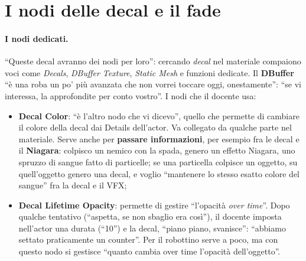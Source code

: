 \section{I nodi delle decal e il fade}
\label{ue16:sec:nodidecal}

\paragraph{I nodi dedicati.} ``Queste decal avranno dei nodi per loro'': cercando \emph{decal}
nel materiale compaiono voci come \emph{Decals}, \emph{DBuffer Texture}, \emph{Static Mesh} e
funzioni dedicate. Il \textbf{DBuffer} ``è una roba un po' più avanzata che non vorrei toccare
oggi, onestamente'': ``se vi interessa, la approfondite per conto vostro''. I nodi che il docente
usa:
\begin{itemize}
  \item \textbf{Decal Color}: ``è l'altro nodo che vi dicevo'', quello che permette di cambiare il
        colore della decal dai Details dell'actor. Va collegato da qualche parte nel materiale.
        Serve anche per \textbf{passare informazioni}, per esempio fra le decal e il
        \textbf{Niagara}: colpisco un nemico con la spada, genero un effetto Niagara, uno
        spruzzo di sangue fatto di particelle; se una particella colpisce un oggetto, su
        quell'oggetto genero una decal, e voglio ``mantenere lo stesso esatto colore del sangue''
        fra la decal e il VFX;
  \item \textbf{Decal Lifetime Opacity}: permette di gestire ``l'opacità \emph{over time}''.
        Dopo qualche tentativo (``aspetta, se non sbaglio era così''), il docente imposta
        nell'actor una durata (``10'') e la decal, ``piano piano, svanisce'': ``abbiamo settato
        praticamente un counter''. Per il robottino serve a poco, ma con questo nodo si gestisce
        ``quanto cambia over time l'opacità dell'oggetto''.
\end{itemize}

